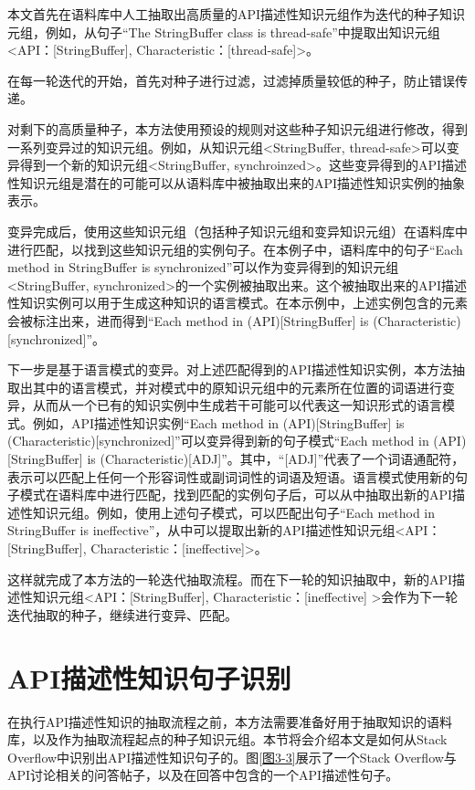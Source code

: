 本文首先在语料库中人工抽取出高质量的API描述性知识元组作为迭代的种子知识元组，例如，从句子“The StringBuffer class is thread-safe”中提取出知识元组<API：[StringBuffer], Characteristic：[thread-safe]>。

在每一轮迭代的开始，首先对种子进行过滤，过滤掉质量较低的种子，防止错误传递。

对剩下的高质量种子，本方法使用预设的规则对这些种子知识元组进行修改，得到一系列变异过的知识元组。例如，从知识元组<StringBuffer, thread-safe>可以变异得到一个新的知识元组<StringBuffer, synchroinzed>。这些变异得到的API描述性知识元组是潜在的可能可以从语料库中被抽取出来的API描述性知识实例的抽象表示。

变异完成后，使用这些知识元组（包括种子知识元组和变异知识元组）在语料库中进行匹配，以找到这些知识元组的实例句子。在本例子中，语料库中的句子“Each method in StringBuffer is synchronized”可以作为变异得到的知识元组<StringBuffer, synchronized>的一个实例被抽取出来。这个被抽取出来的API描述性知识实例可以用于生成这种知识的语言模式。在本示例中，上述实例包含的元素会被标注出来，进而得到“Each method in (API)[StringBuffer] is (Characteristic)[synchronized]”。

下一步是基于语言模式的变异。对上述匹配得到的API描述性知识实例，本方法抽取出其中的语言模式，并对模式中的原知识元组中的元素所在位置的词语进行变异，从而从一个已有的知识实例中生成若干可能可以代表这一知识形式的语言模式。例如，API描述性知识实例“Each method in (API)[StringBuffer] is (Characteristic)[synchronized]”可以变异得到新的句子模式“Each method in (API)[StringBuffer] is (Characteristic)[ADJ]”。其中，“[ADJ]”代表了一个词语通配符，表示可以匹配上任何一个形容词性或副词词性的词语及短语。语言模式使用新的句子模式在语料库中进行匹配，找到匹配的实例句子后，可以从中抽取出新的API描述性知识元组。例如，使用上述句子模式，可以匹配出句子“Each method in StringBuffer is ineffective”，从中可以提取出新的API描述性知识元组<API：[StringBuffer], Characteristic：[ineffective]>。

这样就完成了本方法的一轮迭代抽取流程。而在下一轮的知识抽取中，新的API描述性知识元组<API：[StringBuffer], Characteristic：[ineffective] >会作为下一轮迭代抽取的种子，继续进行变异、匹配。


\section{API描述性知识句子识别}
在执行API描述性知识的抽取流程之前，本方法需要准备好用于抽取知识的语料库，以及作为抽取流程起点的种子知识元组。本节将会介绍本文是如何从Stack Overflow中识别出API描述性知识句子的。图\ref{图3-3}展示了一个Stack Overflow与API讨论相关的问答帖子，以及在回答中包含的一个API描述性句子。

